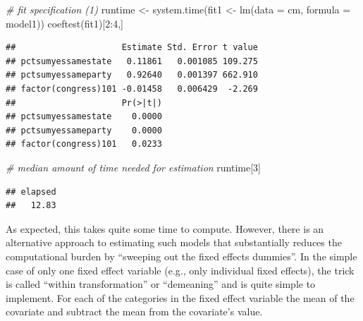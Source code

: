 \documentclass[
  12pt,
]{style/krantz}
\newenvironment{Shaded}{\begin{snugshade}}{\end{snugshade}}
\newcommand{\AttributeTok}[1]{\textcolor[rgb]{0.77,0.63,0.00}{#1}}
\newcommand{\CommentTok}[1]{\textcolor[rgb]{0.56,0.35,0.01}{\textit{#1}}}
\newcommand{\DecValTok}[1]{\textcolor[rgb]{0.00,0.00,0.81}{#1}}
\newcommand{\FunctionTok}[1]{\textcolor[rgb]{0.00,0.00,0.00}{#1}}
\newcommand{\NormalTok}[1]{#1}
\newcommand{\OtherTok}[1]{\textcolor[rgb]{0.56,0.35,0.01}{#1}}
\newcommand{\SpecialCharTok}[1]{\textcolor[rgb]{0.00,0.00,0.00}{#1}}
\begin{document}
\begin{Shaded}
\begin{Highlighting}[]
\CommentTok{\# fit specification (1)}
\NormalTok{runtime }\OtherTok{\textless{}{-}} \FunctionTok{system.time}\NormalTok{(fit1 }\OtherTok{\textless{}{-}} \FunctionTok{lm}\NormalTok{(}\AttributeTok{data =}\NormalTok{ cm, }\AttributeTok{formula =}\NormalTok{ model1))}
\FunctionTok{coeftest}\NormalTok{(fit1)[}\DecValTok{2}\SpecialCharTok{:}\DecValTok{4}\NormalTok{,]}
\end{Highlighting}
\end{Shaded}

\begin{verbatim}
##                     Estimate Std. Error t value
## pctsumyessamestate   0.11861   0.001085 109.275
## pctsumyessameparty   0.92640   0.001397 662.910
## factor(congress)101 -0.01458   0.006429  -2.269
##                     Pr(>|t|)
## pctsumyessamestate    0.0000
## pctsumyessameparty    0.0000
## factor(congress)101   0.0233
\end{verbatim}

\begin{Shaded}
\begin{Highlighting}[]
\CommentTok{\# median amount of time needed for estimation}
\NormalTok{runtime[}\DecValTok{3}\NormalTok{]}
\end{Highlighting}
\end{Shaded}

\begin{verbatim}
## elapsed 
##   12.83
\end{verbatim}

As expected, this takes quite some time to compute. However, there is an alternative approach to estimating such models that substantially reduces the computational burden by ``sweeping out the fixed effects dummies''. In the simple case of only one fixed effect variable (e.g., only individual fixed effects), the trick is called ``within transformation'' or ``demeaning'' and is quite simple to implement. For each of the categories in the fixed effect variable the mean of the covariate and subtract the mean from the covariate's value.
\end{document}
